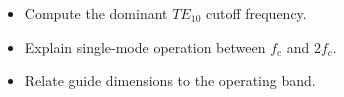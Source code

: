 \begin{objectives}
\begin{itemize}[leftmargin=1.4em,itemsep=2pt]
\item Compute the dominant $TE_{10}$ cutoff frequency.
\item Explain single-mode operation between $f_c$ and $2f_c$.
\item Relate guide dimensions to the operating band.
\end{itemize}
\end{objectives}
